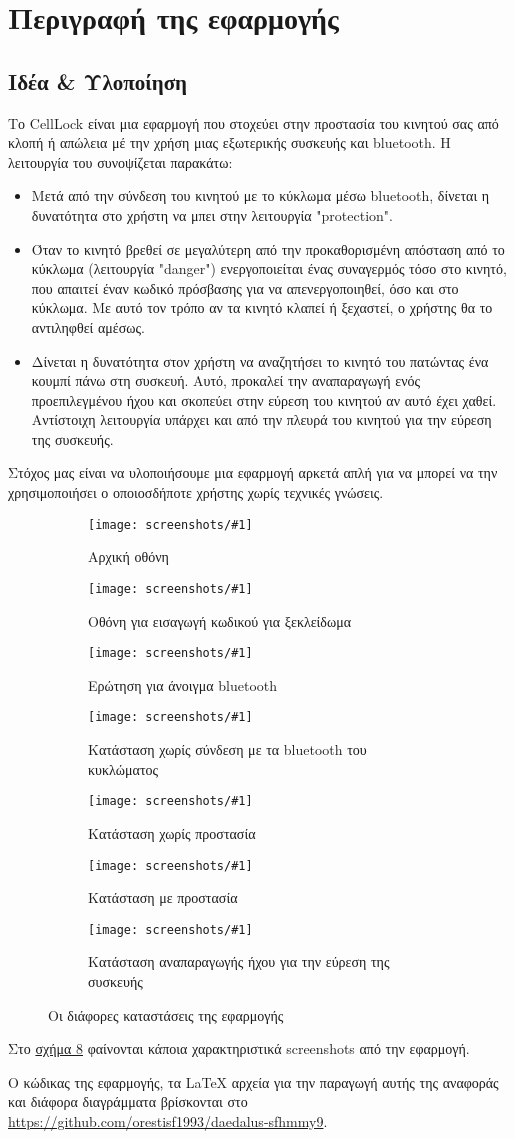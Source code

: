 \section{Περιγραφή της εφαρμογής}
\subsection{Ιδέα \& Υλοποίηση}
\newcommand{\screenshot}[2]{%
\begin{subfigure}{0.5\textwidth}%
\centering%
\texttt{[image: screenshots/\#1]}%
\caption{#2}
\label{fig:#1}%
\end{subfigure}%
}
Το CellLock είναι μια εφαρμογή που στοχεύει στην προστασία του κινητού σας από κλοπή ή απώλεια μέ την χρήση μιας εξωτερικής συσκευής και bluetooth.
Η λειτουργία του συνοψίζεται παρακάτω:
\begin{itemize}
\item Μετά από την σύνδεση του κινητού  με το κύκλωμα μέσω bluetooth, δίνεται η δυνατότητα στο χρήστη να μπει στην λειτουργία "protection".

\item Όταν το κινητό βρεθεί σε μεγαλύτερη από την προκαθορισμένη απόσταση από το κύκλωμα (λειτουργία "danger") ενεργοποιείται ένας συναγερμός τόσο στο κινητό, που απαιτεί έναν κωδικό πρόσβασης για να απενεργοποιηθεί, όσο και στο κύκλωμα.
Με αυτό τον τρόπο αν τα κινητό κλαπεί ή ξεχαστεί, ο χρήστης θα το αντιληφθεί αμέσως.
\item Δίνεται η δυνατότητα στον χρήστη να αναζητήσει το κινητό του πατώντας ένα κουμπί πάνω στη συσκευή.
Αυτό, προκαλεί την αναπαραγωγή ενός προεπιλεγμένου ήχου και σκοπεύει στην εύρεση του κινητού αν αυτό έχει χαθεί.
Αντίστοιχη λειτουργία υπάρχει και από την πλευρά του κινητού για την εύρεση της συσκευής.
\end{itemize}

Στόχος μας είναι να υλοποιήσουμε μια εφαρμογή αρκετά απλή για να μπορεί να την χρησιμοποιήσει ο οποιοσδήποτε χρήστης χωρίς τεχνικές γνώσεις.

\renewcommand{\figurename}{Σχήμα}
\begin{figure}[htbp]
        \screenshot{start}{Αρχική οθόνη}%
        \screenshot{locked}{Οθόνη για εισαγωγή κωδικού για ξεκλείδωμα}
        \screenshot{bluetooth-open}{Ερώτηση για άνοιγμα bluetooth}%
        \screenshot{not-connected}{Κατάσταση χωρίς σύνδεση με τα bluetooth του κυκλώματος}
        \screenshot{not-protected}{Κατάσταση χωρίς προστασία}%
        \screenshot{protected}{Κατάσταση με προστασία}
        \screenshot{ring}{Κατάσταση αναπαραγωγής ήχου για την εύρεση της συσκευής}
        \caption{Οι διάφορες καταστάσεις της εφαρμογής}
        \label{fig:screenshots}
\end{figure}

Στο \hyperref[fig:screenshots]{σχήμα \ref{fig:screenshots}}
φαίνονται κάποια χαρακτηριστικά screenshots από την εφαρμογή.

Ο κώδικας της εφαρμογής, τα \LaTeX{} αρχεία για την παραγωγή αυτής της αναφοράς και διάφορα διαγράμματα βρίσκονται στο
\url{https://github.com/orestisf1993/daedalus-sfhmmy9}.





